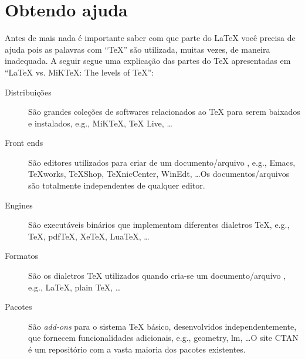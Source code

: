 % 
% 
% 
% 
% 
% 
%
%
\chapter{Obtendo ajuda} \label{sch:get_help}
Antes de mais nada \'{e} importante saber com que parte do LaTeX voc\^{e} precisa de ajuda pois as palavras com ``TeX'' s\~{a}o utilizada, muitas vezes, de maneira inadequada. A seguir segue uma explica\c{c}\~{a}o das partes do TeX apresentadas em ``LaTeX vs. MiKTeX: The levels of TeX''\nocite{TUG:Levels}:
\begin{description}
    \item[Distribui\c{c}\~{o}es] S\~{a}o grandes cole\c{c}\~{o}es de softwares relacionados ao TeX para serem baixados e instalados, e.g., MiKTeX, TeX Live, \ldots 
    \item[Front ends] S\~{a}o editores utilizados para criar de um documento/arquivo , e.g., Emacs, TeXworks, TeXShop, TeXnicCenter, WinEdt, \ldots Os documentos/arquivos  s\~{a}o totalmente independentes de qualquer editor.
    \item[Engines] S\~{a}o execut\'{a}veis bin\'{a}rios que implementam diferentes dialetros TeX, e.g., TeX, pdfTeX, XeTeX, LuaTeX, \ldots
    \item[Formatos] S\~{a}o os dialetros TeX utilizados quando cria-se um documento/arquivo , e.g., LaTeX, plain TeX, \ldots
    \item[Pacotes] S\~{a}o \textit{add-ons} para o sistema TeX b\'{a}sico, desenvolvidos independentemente, que fornecem funcionalidades adicionais, e.g., geometry, lm, \ldots O site CTAN \'{e} um reposit\'{o}rio com a vasta maioria dos pacotes existentes.
\end{description}

